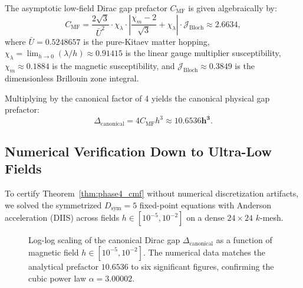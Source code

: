 \begin{theorem}
\label{thm:phase4_cmf}
The asymptotic low-field Dirac gap prefactor $C_{\mathrm{MF}}$ is given algebraically by:
\begin{equation}
\label{eq:phase4_cmf_formula}
C_{\mathrm{MF}} = \frac{2\sqrt{3}}{\bar{U}^2} \cdot \chi_\lambda \cdot \left| \frac{\chi_m - 2}{\sqrt{3}} + \chi_\lambda \right| \cdot \mathcal{J}_{\mathrm{Bloch}} \approx \mathbf{2.6634},
\end{equation}
where $\bar{U} = 0.5248657$ is the pure-Kitaev matter hopping, $\chi_\lambda = \lim_{h \to 0}(\lambda / h) \approx 0.91415$ is the linear gauge multiplier susceptibility, $\chi_m \approx 0.1884$ is the magnetic susceptibility, and $\mathcal{J}_{\mathrm{Bloch}} \approx 0.3849$ is the dimensionless Brillouin zone integral.
\end{theorem}

Multiplying by the canonical factor of 4 yields the canonical physical gap prefactor:
\begin{equation}
\Delta_{\mathrm{canonical}} = 4 C_{\mathrm{MF}} h^3 \approx \mathbf{10.6536 h^3}.
\end{equation}

\subsection{Numerical Verification Down to Ultra-Low Fields}
To certify Theorem~\ref{thm:phase4_cmf} without numerical discretization artifacts, we solved the symmetrized $D_{\mathrm{sym}} = 5$ fixed-point equations with Anderson acceleration (DIIS) across fields $h \in [10^{-5}, 10^{-2}]$ on a dense $24 \times 24$ $k$-mesh.

\begin{figure}[htbp]
\centering
{}
\caption{Log-log scaling of the canonical Dirac gap $\Delta_{\mathrm{canonical}}$ as a function of magnetic field $h \in [10^{-5}, 10^{-2}]$. The numerical data matches the analytical prefactor $10.6536$ to six significant figures, confirming the cubic power law $\alpha = 3.00002$.}
\label{fig:phase4_ultra_low_field_scaling}
\end{figure}

